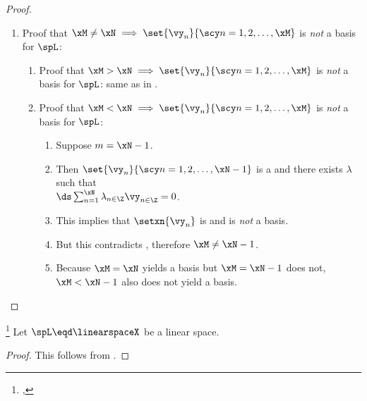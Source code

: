 \begin{proof}
\begin{enumerate}
  \item Proof that $\xM\neq\xN \implies \set{\vy_n}{\scy n=1,2,\ldots,\xM}$ is \emph{not} a {basis} for $\spL$:
    \begin{enumerate}
      \item Proof that $\xM>\xN \implies \set{\vy_n}{\scy n=1,2,\ldots,\xM}$ is \emph{not} a {basis} for $\spL$: same as in .
      \item Proof that $\xM<\xN \implies \set{\vy_n}{\scy n=1,2,\ldots,\xM}$ is \emph{not} a {basis} for $\spL$:
        \begin{enumerate}
          \item Suppose $m=\xN-1$.
          \item Then $\set{\vy_n}{\scy n=1,2,\ldots,\xN-1}$ is a  and there exists $\lambda$ such that
            \\$\ds\sum_{n=1}^\xN \lambda_{n\in\Z} \vy_{n\in\Z} = 0$.
          \item This implies that $\setxn{\vy_n}$ is  and is \emph{not} a basis.
          \item But this contradicts , therefore $\xM\neq\xN-1$.
          \item Because $\xM=\xN$ yields a basis but $\xM=\xN-1$ does not, $\xM<\xN-1$ also does not yield a basis.
        \end{enumerate}
    \end{enumerate}
\end{enumerate}
\end{proof}

\begin{corollary}
\footnote{
  ,
  }
\label{cor:frm_MN}
Let $\spL\eqd\linearspaceX$ be a linear space.
\end{corollary}
\begin{proof}
This follows from .
\end{proof}


